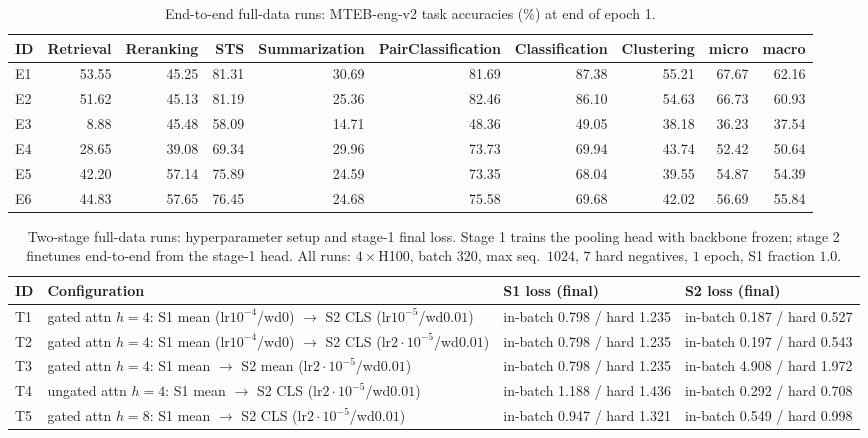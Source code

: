 \documentclass{article}
\begin{document}
\begin{table}[ht]
\centering
\small
\setlength{\tabcolsep}{4pt}
\caption{End-to-end full-data runs: MTEB-eng-v2 task accuracies (\%) at end of epoch 1.}
\label{tab:e2e-perf}
\begin{tabular}{lrrrrrrrrr}
\toprule
ID & Retrieval & Reranking & STS & Summarization & PairClassification & Classification & Clustering & micro & macro \\
\midrule
E1 & 53.55 & 45.25 & 81.31 & 30.69 & 81.69 & 87.38 & 55.21 & 67.67 & 62.16 \\
E2 & 51.62 & 45.13 & 81.19 & 25.36 & 82.46 & 86.10 & 54.63 & 66.73 & 60.93 \\
E3 & 8.88 & 45.48 & 58.09 & 14.71 & 48.36 & 49.05 & 38.18 & 36.23 & 37.54 \\
E4 & 28.65 & 39.08 & 69.34 & 29.96 & 73.73 & 69.94 & 43.74 & 52.42 & 50.64 \\
E5 & 42.20 & 57.14 & 75.89 & 24.59 & 73.35 & 68.04 & 39.55 & 54.87 & 54.39 \\
E6 & 44.83 & 57.65 & 76.45 & 24.68 & 75.58 & 69.68 & 42.02 & 56.69 & 55.84 \\
\bottomrule
\end{tabular}
\end{table}



\begin{table}[ht]
\centering
\small
\setlength{\tabcolsep}{4pt}
\caption{Two-stage full-data runs: hyperparameter setup and stage-1 final loss. Stage 1 trains the pooling head with backbone frozen; stage 2 finetunes end-to-end from the stage-1 head. All runs: $4{\times}$H100, batch $320$, max seq.\ $1024$, $7$ hard negatives, $1$ epoch, S1 fraction $1.0$.}
\label{tab:s2-hparams}
\begin{tabular}{ll l l}
\toprule
ID & Configuration & S1 loss (final) & S2 loss (final) \\
\midrule
T1 & gated attn $h{=}4$: S1 mean (lr$10^{-4}$/wd$0$) $\to$ S2 CLS (lr$10^{-5}$/wd$0.01$) & in-batch 0.798 / hard 1.235 & in-batch 0.187 / hard 0.527 \\
T2 & gated attn $h{=}4$: S1 mean (lr$10^{-4}$/wd$0$) $\to$ S2 CLS (lr$2{\cdot}10^{-5}$/wd$0.01$) & in-batch 0.798 / hard 1.235 & in-batch 0.197 / hard 0.543 \\
T3 & gated attn $h{=}4$: S1 mean $\to$ S2 mean (lr$2{\cdot}10^{-5}$/wd$0.01$) & in-batch 0.798 / hard 1.235 & in-batch 4.908 / hard 1.972 \\
T4 & ungated attn $h{=}4$: S1 mean $\to$ S2 CLS (lr$2{\cdot}10^{-5}$/wd$0.01$) & in-batch 1.188 / hard 1.436 & in-batch 0.292 / hard 0.708 \\
T5 & gated attn $h{=}8$: S1 mean $\to$ S2 CLS (lr$2{\cdot}10^{-5}$/wd$0.01$) & in-batch 0.947 / hard 1.321 & in-batch 0.549 / hard 0.998 \\
\bottomrule
\end{tabular}
\end{table}
\end{document}
